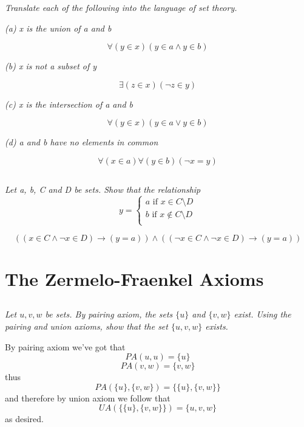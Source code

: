 \documentclass[11pt,oneside,titlepage]{book}
\begin{document}
\textit{Translate each of the following into the language of set theory.}

\textit{(a) x is the union of a and b}

$$\forall (y \in x) (y \in a \land y \in b)$$

\textit{(b) x is not a subset of y}

$$\exists (z \in x) (\neg z \in y)$$

\textit{(c) x is the intersection of a and b}

$$\forall (y \in x) (y \in a \lor y \in b)$$

\textit{(d) a and b have no elements in common}

$$\forall (x \in a) \forall (y \in b) (\neg x = y)$$

\subsection{}

\textit{Let a, b, C and D be sets. Show that the relationship}
$$y =
\begin{cases}
  a \text{ if } x \in C \setminus D \\
  b \text{ if } x \notin C \setminus D \\
\end{cases}
$$

$$((x \in C \land \neg x \in D) \to (y = a)) \land ((\neg x \in C \land \neg x \in D) \to (y = a))$$


\section{The Zermelo-Fraenkel Axioms}

\subsection{}

\textit{Let $u, v, w$ be sets. By pairing axiom, the sets $\{u\}$ and $\{v, w\}$
  exist. Using the pairing and union axioms, show that the set $\{u, v, w\}$
  exists.}

By pairing axiom we've got that
$$PA(u, u) = \{u\}$$
$$PA(v, w) = \{v, w\}$$
thus
$$PA(\{u\}, \{v, w\}) = \{\{u\}, \{v, w\}\}$$
and therefore by union axiom we follow that
$$UA(\{\{u\}, \{v, w\}\}) = \{u, v, w\}$$
as desired.

\subsection{}
\end{document}
